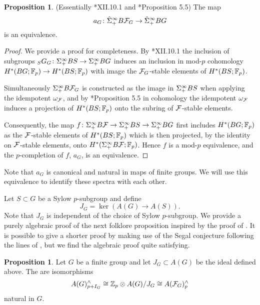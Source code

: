 \documentclass[10pt]{amsart}
\theoremstyle{definition}
\newtheorem{proposition}[theorem]{Proposition}
\begin{document}
\begin{proposition} \label{aG} (Essentially \cite{CartanEilenberg}*{XII.10.1} and \cite{BLO2}*{Proposition 5.5})
The map
\[
a_G \colon \hat{\Sigma}^{\infty}_{+} B\mathcal{F}_G \rightarrow \hat{\Sigma}^{\infty}_{+} BG
\]
is an equivalence.
\end{proposition}

\begin{proof}[Proof] We provide a proof for completeness.
By \cite{CartanEilenberg}*{XII.10.1} the inclusion of subgroups ${}_S G_G \colon \Sigma^{\infty}_{+} BS \rightarrow \Sigma^{\infty}_{+} BG$ induces an inclusion in mod-$p$ cohomology $H^*(BG;\mathbb{F}_p) \to H^*(BS;\mathbb{F}_p)$ with image the $\mathcal{F}_G$-stable elements of $H^*(BS;\mathbb{F}_p)$.

Simultaneously $\Sigma^{\infty}_{+} B\mathcal{F}_G$ is constructed as the image in $\Sigma^{\infty}_{+} BS$ when applying the idempotent $\omega_{\mathcal{F}}$, and by \cite{BLO2}*{Proposition 5.5} in cohomology the idempotent $\omega_{\mathcal{F}}$ induces a projection of $H^*(BS;\mathbb{F}_p)$ onto the subring of $\mathcal{F}$-stable elements.

Consequently, the map $f\colon \Sigma^{\infty}_{+} B\mathcal{F} \to \Sigma^{\infty}_{+} BS\to \Sigma^{\infty}_{+} BG$ first includes $H^*(BG;\mathbb{F}_p)$ as the $\mathcal{F}$-stable elements of $H^*(BS;\mathbb{F}_p)$ which is then projected, by the identity on $\mathcal{F}$-stable elements, onto $H^*(\Sigma^{\infty}_{+} B\mathcal{F};\mathbb{F}_p)$. Hence $f$ is a mod-$p$ equivalence, and the $p$-completion of $f$, $a_G$, is an equivalence.
\end{proof}

Note that $a_G$ is canonical and natural in maps of finite groups. We will use this equivalence to identify these spectra with each other.




Let $S \subset G$ be a Sylow $p$-subgroup and define
\[
J_G = \ker(A(G) \rightarrow A(S)).
\]
Note that $J_G$ is independent of the choice of Sylow $p$-subgroup. We provide a purely algebraic proof of the next folklore proposition inspired by the proof of \cite[Lemma 5]{MayMcClure}. It is possible to give a shorter proof by making use of the Segal conjecture following the lines of \cite[Proposition 9.7]{Strickland}, but we find the algebraic proof quite satisfying.

\begin{proposition}\label{propIsoOfCompletions}
Let $G$ be a finite group and let $J_G \subset A(G)$ be the ideal defined above. The are isomorphisms
\[
A(G)^{\wedge}_{p+I_G} \cong \mathbb{Z}_p \otimes A(G)/J_G \cong A(\mathcal{F}_G)^\wedge_p
\]
natural in $G$.
\end{proposition}
\end{document}
